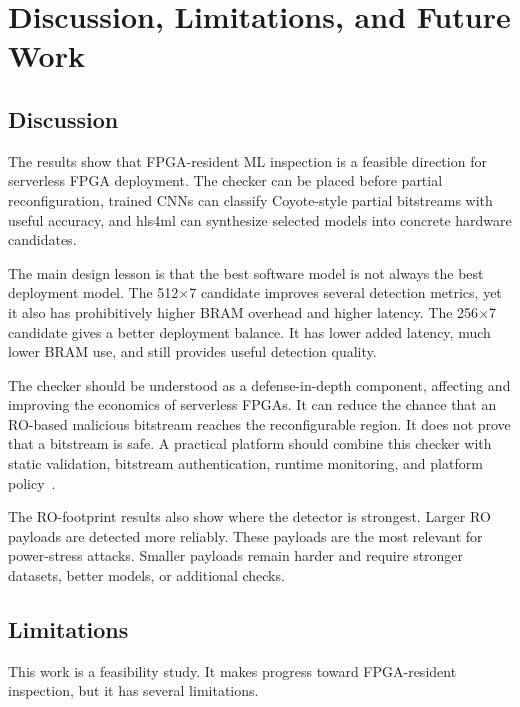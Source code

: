 \chapter{Discussion, Limitations, and Future Work}
\label{ch:discussion}

\section{Discussion}
\label{sec:discussion}

The results show that FPGA-resident ML inspection is a feasible direction for serverless FPGA deployment. The checker can be placed before partial reconfiguration, trained CNNs can classify Coyote-style partial bitstreams with useful accuracy, and hls4ml can synthesize selected models into concrete hardware candidates.

The main design lesson is that the best software model is not always the best deployment model. The 512$\times$7 candidate improves several detection metrics, yet it also has prohibitively higher BRAM overhead and higher latency. The 256$\times$7 candidate gives a better deployment balance. It has lower added latency, much lower BRAM use, and still provides useful detection quality.

The checker should be understood as a defense-in-depth component, affecting and improving the economics of serverless FPGAs. It can reduce the chance that an RO-based malicious bitstream reaches the reconfigurable region. It does not prove that a bitstream is safe. A practical platform should combine this checker with static validation, bitstream authentication, runtime monitoring, and platform policy~\cite{jin2020security,zhang2019recent,ahmed2022multitenant}.

The RO-footprint results also show where the detector is strongest. Larger RO payloads are detected more reliably. These payloads are the most relevant for power-stress attacks. Smaller payloads remain harder and require stronger datasets, better models, or additional checks.

\section{Limitations}
\label{sec:limitations}

This work is a feasibility study. It makes progress toward FPGA-resident inspection, but it has several limitations.

